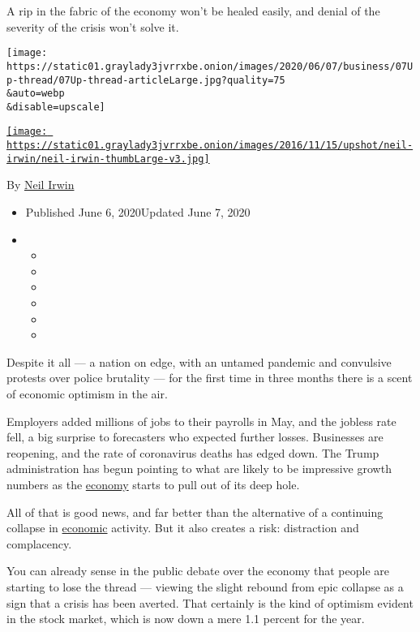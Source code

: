 A rip in the fabric of the economy won't be healed easily, and denial of
the severity of the crisis won't solve it.

\texttt{[image: https://static01.graylady3jvrrxbe.onion/images/2020/06/07/business/07Up-thread/07Up-thread-articleLarge.jpg?quality=75\\\&auto=webp\\\&disable=upscale]}

\href{https://www.nytimes3xbfgragh.onion/by/neil-irwin}{\texttt{[image: https://static01.graylady3jvrrxbe.onion/images/2016/11/15/upshot/neil-irwin/neil-irwin-thumbLarge-v3.jpg]}}

By \href{https://www.nytimes3xbfgragh.onion/by/neil-irwin}{Neil Irwin}

\begin{itemize}
\item
  Published June 6, 2020Updated June 7, 2020
\item
  \begin{itemize}
  \item
  \item
  \item
  \item
  \item
  \item
  \end{itemize}
\end{itemize}

Despite it all --- a nation on edge, with an untamed pandemic and
convulsive protests over police brutality --- for the first time in
three months there is a scent of economic optimism in the air.

Employers added millions of jobs to their payrolls in May, and the
jobless rate fell, a big surprise to forecasters who expected further
losses. Businesses are reopening, and the rate of coronavirus deaths has
edged down. The Trump administration has begun pointing to what are
likely to be impressive growth numbers as the
\href{https://www.nytimes3xbfgragh.onion/2020/07/15/business/economy/economic-recovery-coronavirus-resurgence.html}{economy}
starts to pull out of its deep hole.

All of that is good news, and far better than the alternative of a
continuing collapse in
\href{https://www.nytimes3xbfgragh.onion/2020/07/15/business/economy/economic-recovery-coronavirus-resurgence.html}{economic}
activity. But it also creates a risk: distraction and complacency.

You can already sense in the public debate over the economy that people
are starting to lose the thread --- viewing the slight rebound from epic
collapse as a sign that a crisis has been averted. That certainly is the
kind of optimism evident in the stock market, which is now down a mere
1.1 percent for the year.

